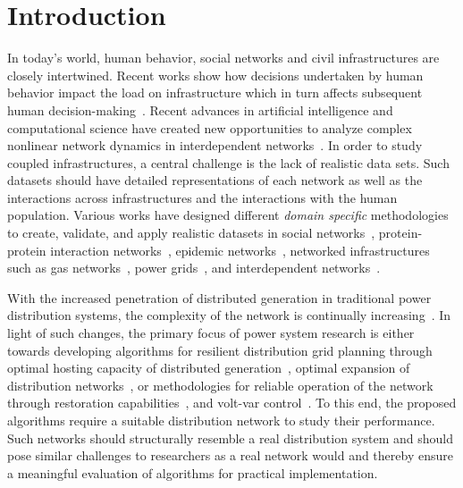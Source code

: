 \documentclass[sigconf]{acmart}
\newcommand{\samarth}[1]{{\color{blue}\textsf{#1 -- Samarth}}}
\begin{document}
\maketitle

\section{Introduction}\label{sec:intro}
In today's world, human behavior, social networks and civil infrastructures are closely intertwined. Recent works show how decisions undertaken by human behavior impact the load on infrastructure which in turn affects subsequent human decision-making~\cite{Zeng2019,Duan2019}. Recent advances in artificial intelligence and computational science have created new opportunities to analyze complex nonlinear network dynamics in interdependent networks~\cite{Adiga_2020}. In order to study coupled infrastructures, a central challenge is the lack of realistic data sets. Such datasets should have detailed representations of each network as well as the interactions across infrastructures and the interactions with the human population. Various works have designed different \emph{domain specific} methodologies to create, validate, and apply realistic datasets in social networks~\cite{social,gursoy2019communityaware}, protein-protein interaction networks~\cite{protein,ppn}, epidemic networks~\cite{epidemiology}, networked infrastructures such as gas networks~\cite{gas}, power grids~\cite{overbye_101,overbye_102,overbye_2019}, and interdependent networks~\cite{Barrett2006,barrett2001transims}. 

With the increased penetration of distributed generation in traditional power distribution systems, the complexity of the network is continually increasing~\cite{schweitzer}. In light of such changes, the primary focus of power system research is either towards developing algorithms for resilient distribution grid planning through optimal hosting capacity of distributed generation~\cite{taheri2020fast}, optimal expansion of distribution networks~\cite{dist_recon_2012}, or methodologies for reliable operation of the network through restoration capabilities~\cite{manish2018OptimalDS}, and volt-var control~\cite{manish2019}. To this end, the proposed algorithms require a suitable distribution network to study their performance. Such networks should structurally resemble a real distribution system and should pose similar challenges to researchers as a real network would and thereby ensure 
a meaningful evaluation of algorithms for practical implementation.
\end{document}
